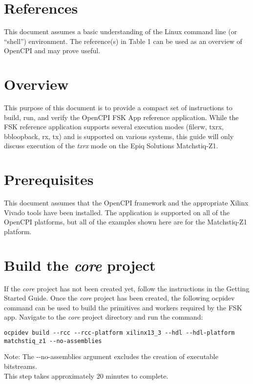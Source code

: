 \newpage

\tableofcontents

\newpage

\section{References}

	This document assumes a basic understanding of the Linux command line (or ``shell'') environment.  The reference(s) in Table 1 can be used as an overview of OpenCPI and may prove useful.

\def\myreferences{
\hline
FSK App\footnote{Provides details of the ``FSK App'' reference application} & \path{FSK_app.pdf} \\
}


\newpage
\begin{flushleft}
\section{Overview}
This purpose of this document is to provide a compact set of instructions to build, run, and verify the OpenCPI FSK App reference application. While the FSK reference application supports several execution modes (filerw, txrx, bbloopback, rx, tx) and is supported on various systems, this guide will only discuss execution of the \textit{txrx} mode on the Epiq Solutions Matchstiq-Z1.

\section{Prerequisites}
This document assumes that the OpenCPI framework and the appropriate  Xilinx Vivado tools have been installed. The application is supported on all of the OpenCPI platforms, but all of the examples shown here are for the Matchstiq-Z1 platform.

\section{Build the \textit{core} project}
If the \textit{core} project has not been created yet, follow the instructions in the Getting Started Guide. Once the \textit{core} project has been created, the following ocpidev command can be used to build the primitives and workers required by the FSK app. Navigate to the \textit{core} project directory and run the command:
\begin{verbatim}
ocpidev build --rcc --rcc-platform xilinx13_3 --hdl --hdl-platform matchstiq_z1 --no-assemblies
\end{verbatim}
Note: The -\/-no-assemblies argument excludes the creation of executable bitstreams.\\
This step takes approximately 20 minutes to complete.\\


\end{flushleft}
